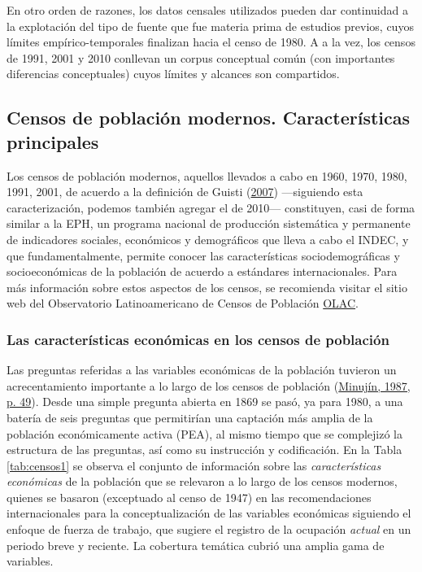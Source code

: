 \documentclass[
]{article}
\begin{document}
En otro orden de razones, los datos censales utilizados pueden dar continuidad a la explotación del tipo de fuente que fue materia prima de estudios previos, cuyos límites empírico-temporales finalizan hacia el censo de 1980. A a la vez, los censos de 1991, 2001 y 2010 conllevan un corpus conceptual común (con importantes diferencias conceptuales) cuyos límites y alcances son compartidos.

\hypertarget{censos}{%
\subsection{Censos de población modernos. Características principales}\label{censos}}

Los censos de población modernos, aquellos llevados a cabo en 1960, 1970, 1980, 1991, 2001, de acuerdo a la definición de Guisti (\protect\hyperlink{ref-Giusti2007}{2007}) ---siguiendo esta caracterización, podemos también agregar el de 2010--- constituyen, casi de forma similar a la EPH, un programa nacional de producción sistemática y permanente de indicadores sociales, económicos y demográficos que lleva a cabo el INDEC, y que fundamentalmente, permite conocer las características sociodemográficas y socioeconómicas de la población de acuerdo a estándares internacionales. Para más información sobre estos aspectos de los censos, se recomienda visitar el sitio web del Observatorio Latinoamericano de Censos de Población \href{https://observatoriocensal.org/}{OLAC}.

\hypertarget{las-caracteruxedsticas-econuxf3micas-en-los-censos-de-poblaciuxf3n}{%
\subsubsection{Las características económicas en los censos de población}\label{las-caracteruxedsticas-econuxf3micas-en-los-censos-de-poblaciuxf3n}}

Las preguntas referidas a las variables económicas de la población tuvieron un acrecentamiento importante a lo largo de los censos de población (\protect\hyperlink{ref-Minujin1987}{Minujín, 1987, p. 49}). Desde una simple pregunta abierta en 1869 se pasó, ya para 1980, a una batería de seis preguntas que permitirían una captación más amplia de la población económicamente activa (PEA), al mismo tiempo que se complejizó la estructura de las preguntas, así como su instrucción y codificación. En la Tabla \ref{tab:censos1} se observa el conjunto de información sobre las \emph{características económicas} de la población que se relevaron a lo largo de los censos modernos, quienes se basaron (exceptuado al censo de 1947) en las recomendaciones internacionales para la conceptualización de las variables económicas siguiendo el enfoque de fuerza de trabajo, que sugiere el registro de la ocupación \emph{actual} en un periodo breve y reciente. La cobertura temática cubrió una amplia gama de variables.
\end{document}
